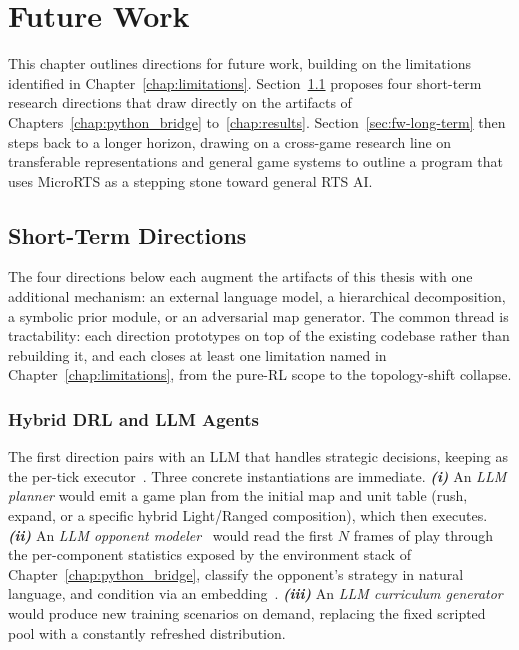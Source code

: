 \chapter{Future Work}
\label{chap:future-work}

This chapter outlines directions for future work, building on the limitations identified in Chapter~\ref{chap:limitations}. Section~\ref{sec:fw-short-term} proposes four short-term research directions that draw directly on the artifacts of Chapters~\ref{chap:python_bridge} to~\ref{chap:results}. Section~\ref{sec:fw-long-term} then steps back to a longer horizon, drawing on a cross-game research line on transferable representations and general game systems to outline a program that uses MicroRTS as a stepping stone toward general RTS AI.

\section{Short-Term Directions}
\label{sec:fw-short-term}

The four directions below each augment the artifacts of this thesis with one additional mechanism: an external language model, a hierarchical decomposition, a symbolic prior module, or an adversarial map generator. The common thread is tractability: each direction prototypes on top of the existing codebase rather than rebuilding it, and each closes at least one limitation named in Chapter~\ref{chap:limitations}, from the pure-RL scope to the topology-shift collapse.

\subsection{Hybrid DRL and LLM Agents}

The first direction pairs  with an LLM that handles strategic decisions, keeping  as the per-tick executor~\cite{cuiEmpoweringLLMsParameterized2025, maAdaptiveCommandRealTime2025}. Three concrete instantiations are immediate. \textbf{\emph{(i)}} An \emph{LLM planner} would emit a game plan from the initial map and unit table (rush, expand, or a specific hybrid Light/Ranged composition), which  then executes. \textbf{\emph{(ii)}} An \emph{LLM opponent modeler}~\cite{guoSuspicionAgentPlayingImperfect2023, mallampatiDynamicStrategyAdaptation2025} would read the first $N$ frames of play through the per-component statistics exposed by the environment stack of Chapter~\ref{chap:python_bridge}, classify the opponent's strategy in natural language, and condition  via an embedding~\cite{perezFiLMVisualReasoning2018}. \textbf{\emph{(iii)}} An \emph{LLM curriculum generator} would produce new training scenarios on demand, replacing the fixed scripted pool with a constantly refreshed distribution.

